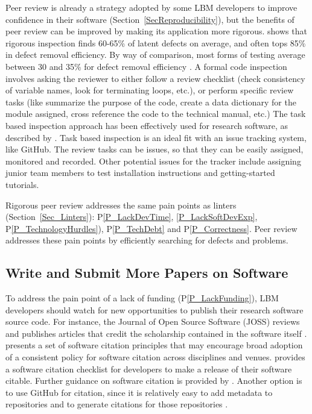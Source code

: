 \documentclass[final, 3p, times, authoryear]{elsarticle}
\newcommand{\ppref}[1]{P\ref{#1}}
\begin{document}
Peer review is already a strategy adopted by some LBM developers to improve
confidence in their software (Section~\ref{SecReproducibility}), but the
benefits of peer review can be improved by making its application more rigorous.
\citet{Jones2008} shows that rigorous inspection finds 60-65\% of latent defects
on average, and often tops 85\% in defect removal efficiency.  By way of
comparison, most forms of testing average between 30 and 35\% for defect removal
efficiency \citep{EbertAndJones2009, Jones2008}.  A formal code inspection
involves asking the reviewer to either follow a review checklist (check
consistency of variable names, look for terminating loops, etc.), or perform
specific review tasks (like summarize the purpose of the code, create a data
dictionary for the module assigned, cross reference the code to the technical
manual, etc.) The task based inspection approach has been effectively used for
research software, as described by \citet{KellyAndShepard2000}. Task based
inspection is an ideal fit with an issue tracking system, like GitHub.  The
review tasks can be issues, so that they can be easily assigned, monitored and
recorded.  Other potential issues for the tracker include assigning junior team
members to test installation instructions and getting-started tutorials.

Rigorous peer review addresses the same pain points as linters
(Section~\ref{Sec_Linters}): \ppref{P_LackDevTime}, \ref{P_LackSoftDevExp},
\ppref{P_TechnologyHurdles}), \ppref{P_TechDebt} and \ppref{P_Correctness}. Peer
review addresses these pain points by efficiently searching for defects and
problems.

\subsection{Write and Submit More Papers on Software}

To address the pain point of a lack of funding (\ppref{P_LackFunding}), LBM
developers should watch for new opportunities to publish their research software
source code. For instance, the Journal of Open Source Software (JOSS) reviews
and publishes articles that credit the scholarship contained in the software
itself \citep{SmithEtAl2018-joss}.  \citep{SmithEtAl2016-softcite} presents a
set of software citation principles that may encourage broad adoption of a
consistent policy for software citation across disciplines and venues.
\citep{ChueHongEtAl2019} provides a software citation checklist for developers
to make a release of their software citable.  Further guidance on software
citation is provided by \citet{KatzEtAl2021}.  Another option is to use GitHub
for citation, since it is relatively easy to add metadata to repositories and to
generate citations for those repositories \citet{Smith2021-CitationsOnGitHub}.
\end{document}
